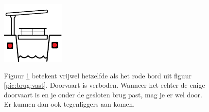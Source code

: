 \newpage

\begin{figure}[H]
  \centering
  \begin{minipage}[b]{0.18\textwidth}
    \includegraphics[width=\textwidth]{Hoofdstukken/Bruggen/pdf/brug_doorvaart_verboden.pdf}
    \caption{}
    \label{pic:brug:verboden}
  \end{minipage}
  \hfill
  \begin{minipage}[t]{0.75\textwidth}
  	\vspace{-2.5cm}
    Figuur \ref{pic:brug:verboden} betekent vrijwel hetzelfde als het rode bord uit figuur \ref{pic:brug:vast}. Doorvaart is verboden. Wanneer het echter de enige doorvaart is en je onder de gesloten brug past, mag je er wel door. Er kunnen dan ook tegenliggers aan komen.
  \end{minipage}
\end{figure}
\vspace{-0.75cm}
